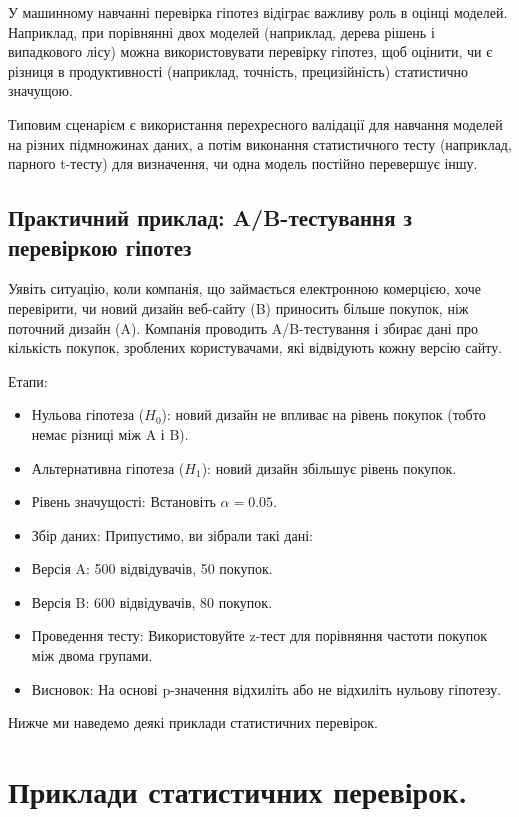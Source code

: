 У машинному навчанні перевірка гіпотез відіграє важливу роль в оцінці моделей. Наприклад, при порівнянні двох моделей (наприклад, дерева рішень і випадкового лісу) можна використовувати перевірку гіпотез, щоб оцінити, чи є різниця в продуктивності (наприклад, точність, прецизійність) статистично значущою.

Типовим сценарієм є використання перехресного валідації для навчання моделей на різних підмножинах даних, а потім виконання статистичного тесту (наприклад, парного t-тесту) для визначення, чи одна модель постійно перевершує іншу.


\subsection{Практичний приклад: A/B-тестування з перевіркою гіпотез}

Уявіть ситуацію, коли компанія, що займається електронною комерцією, хоче перевірити, чи новий дизайн веб-сайту (B) приносить більше покупок, ніж поточний дизайн (A). Компанія проводить A/B-тестування і збирає дані про кількість покупок, зроблених користувачами, які відвідують кожну версію сайту.

Етапи:

\begin{itemize}
\item Нульова гіпотеза ($H_0$): новий дизайн не впливає на рівень покупок (тобто немає різниці між A і B).
\item Альтернативна гіпотеза ($H_1$): новий дизайн збільшує рівень покупок.
\item Рівень значущості: Встановіть $\alpha= 0.05$.
\item Збір даних: Припустимо, ви зібрали такі дані:
\item Версія A: 500 відвідувачів, 50 покупок.
\item Версія B: 600 відвідувачів, 80 покупок.
\item Проведення тесту: Використовуйте z-тест для порівняння частоти покупок між двома групами.
\item Висновок: На основі p-значення відхиліть або не відхиліть нульову гіпотезу.
\end{itemize}

Нижче ми наведемо деякі приклади статистичних перевірок.

\section{Приклади статистичних перевірок.}


